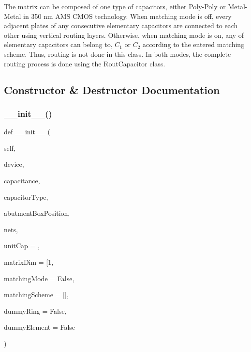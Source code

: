 The matrix can be composed of one type of capacitors, either Poly-\/\+Poly or Metal-\/\+Metal in 350 nm A\+MS C\+M\+OS technology. When matching mode is off, every adjacent plates of any consecutive elementary capacitors are connected to each other using vertical routing layers. Otherwise, when matching mode is on, any of elementary capacitors can belong to, $ C_1 $ or $ C_2 $ according to the entered matching scheme. Thus, routing is not done in this class. In both modes, the complete routing process is done using the {\ttfamily Rout\+Capacitor} class. 

\subsection{Constructor \& Destructor Documentation}
\mbox{\label{classpython_1_1capacitormatrix_1_1CapacitorStack_a7e9bfbe8f722de7d3472f6971e235328}} 
\subsubsection{\texorpdfstring{\+\_\+\+\_\+init\+\_\+\+\_\+()}{\_\_init\_\_()}}
{\footnotesize\ttfamily def \+\_\+\+\_\+init\+\_\+\+\_\+ (\begin{DoxyParamCaption}\item[{}]{self,  }\item[{}]{device,  }\item[{}]{capacitance,  }\item[{}]{capacitor\+Type,  }\item[{}]{abutment\+Box\+Position,  }\item[{}]{nets,  }\item[{}]{unit\+Cap = {},  }\item[{}]{matrix\+Dim = {\ttfamily \mbox{[}1},  }\item[{}]{matching\+Mode = {\ttfamily False},  }\item[{}]{matching\+Scheme = {\ttfamily \mbox{[}\mbox{]}},  }\item[{}]{dummy\+Ring = {\ttfamily False},  }\item[{}]{dummy\+Element = {\ttfamily False} }\end{DoxyParamCaption})}



